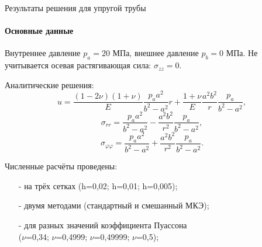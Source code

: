 \documentclass{beamer}
\begin{document}
\begin{frame}{Результаты решения для упругой трубы}
\small
\framesubtitle{Основные данные}
Внутреннее давление $p_a=20$ МПа, внешнее давление $p_b=0$ МПа. Не учитывается осевая растягивающая сила: $\sigma_{zz}=0$.

Аналитические решения:
\begin{equation*}
u=\frac{\left(1-2\nu\right)\left(1+\nu\right)}{E} \frac{p_a a^2}{b^2-a^2}r+\frac{1+\nu}{E}\frac{a^2 b^2}{r}\frac{p_a}{b^2-a^2},
\end{equation*}
\begin{equation*}
\sigma_{rr}=\frac{p_a a^2}{b^2-a^2}-\frac{a^2 b^2}{r^2}\frac{p_a}{b^2 -a^2},
\end{equation*}
\begin{equation*}
\sigma_{\varphi\varphi}=\frac{p_a a^2}{b^2-a^2}+\frac{a^2 b^2}{r^2}\frac{p_a}{b^2 -a^2}.
\end{equation*}	

Численные расчёты проведены:
\smallskip
\begin{itemize}
\item[-]на трёх сетках (h=0,02; h=0,01; h=0,005);
\smallskip
\item[-]двумя методами (стандартный и смешанный МКЭ);
\smallskip
\item[-]для разных значений коэффициента Пуассона \\ ($\nu$=0,34; $\nu$=0,4999; $\nu$=0,49999; $\nu$=0,5);
\end{itemize}
\end{frame}
\end{document}
